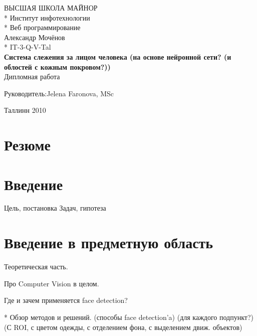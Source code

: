 \documentclass[12pt]{report}
\begin{document}

\begin{titlepage}
  \begin{center}
	\uppercase{Высшая школа майнор}\\*
	Институт инфотехнологии\\*
	Веб программирование\\[8cm]
	Александр Мочёнов\\*
	IT-3-Q-V-Tal\\[0.5cm]
	\large
	\textbf{Система слежения за лицом человека (на основе нейронной сети? (и облостей с кожным покровом?))}\\[1cm]
	\normalsize
	Дипломная работа\\[2cm]
	\begin{flushright}
		Руководитель:Jelena Faronova, MSc\\[7cm]
	\end{flushright}
	Таллинн 2010
  \end{center}
\end{titlepage}

\tableofcontents{\thispagestyle{fancyplain}}

\chapter*{Резюме}
\thispagestyle{fancy}



\chapter*{Введение}
\thispagestyle{fancy}

Цель, постановка Задач, гипотеза

\chapter{Введение в предметную область}
\thispagestyle{fancy}

Теоретическая часть.

Про Computer Vision в целом.

Где и зачем применяется face detection?

* Обзор методов и решений. (способы face detection’a) (для каждого подпункт?) (С ROI, с цветом одежды, с отделением фона, с выделением движ. объектов)
\end{document}
